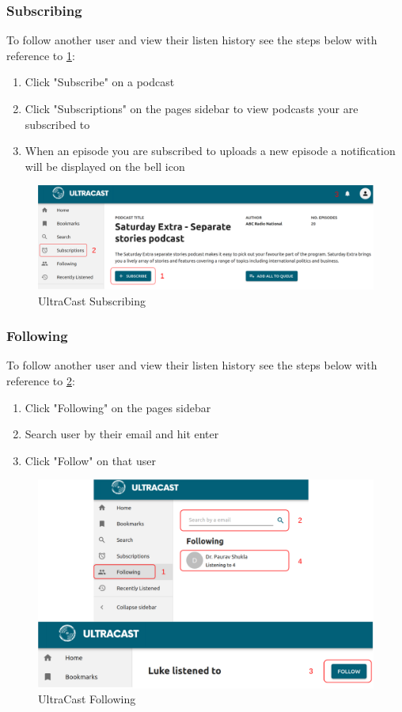 \documentclass[../report.tex]{subfiles}
\begin{document}
\subsubsection{Subscribing}
To follow another user and view their listen history see the steps below with reference to \cref{fig:UM_subscribe}:
\begin{enumerate}
    \item Click "Subscribe" on a podcast
    \item Click "Subscriptions" on the pages sidebar to view podcasts your are subscribed to
    \item When an episode you are subscribed to uploads a new episode a notification will be displayed on the bell icon
\end{enumerate}
\begin{figure}[ht]
    \centering
    \includegraphics[width=16cm]{resources/UM_Subscribe}
    \caption{UltraCast Subscribing}
    \label{fig:UM_subscribe} 
\end{figure}


\subsubsection{Following}
To follow another user and view their listen history see the steps below with reference to \cref{fig:UM_following}:
\begin{enumerate}
    \item Click "Following" on the pages sidebar
    \item Search user by their email and hit enter
    \item Click "Follow" on that user
\end{enumerate}
\begin{figure}[ht]
    \centering
    \includegraphics[width=16cm]{resources/UM_Follow}
    \caption{UltraCast Following}
    \label{fig:UM_following} 
\end{figure}
\newpage
\end{document}
